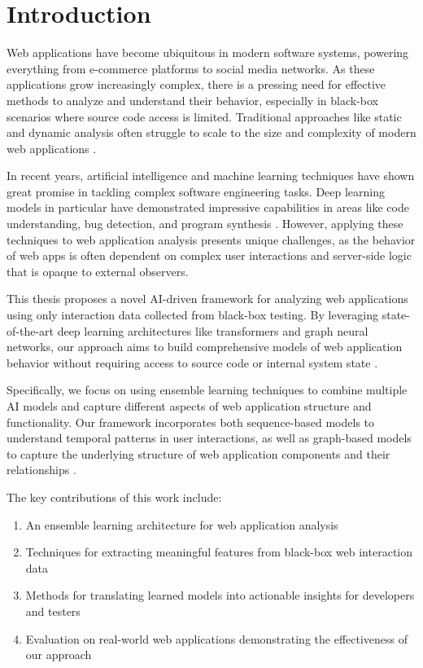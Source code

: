 \chapter{Introduction}
Web applications have become ubiquitous in modern software systems, powering everything from e-commerce platforms to social media networks. As these applications grow increasingly complex, there is a pressing need for effective methods to analyze and understand their behavior, especially in black-box scenarios where source code access is limited. Traditional approaches like static and dynamic analysis often struggle to scale to the size and complexity of modern web applications \cite{gan2013anomaly}.

In recent years, artificial intelligence and machine learning techniques have shown great promise in tackling complex software engineering tasks. Deep learning models in particular have demonstrated impressive capabilities in areas like code understanding, bug detection, and program synthesis \cite{mohammed2021effective}. However, applying these techniques to web application analysis presents unique challenges, as the behavior of web apps is often dependent on complex user interactions and server-side logic that is opaque to external observers.

This thesis proposes a novel AI-driven framework for analyzing web applications using only interaction data collected from black-box testing. By leveraging state-of-the-art deep learning architectures like transformers and graph neural networks, our approach aims to build comprehensive models of web application behavior without requiring access to source code or internal system state \cite{ding2022velvet}.

Specifically, we focus on using ensemble learning techniques to combine multiple AI models and capture different aspects of web application structure and functionality. Our framework incorporates both sequence-based models to understand temporal patterns in user interactions, as well as graph-based models to capture the underlying structure of web application components and their relationships \cite{mohammed2021effective}.
 
 The key contributions of this work include:

\begin{enumerate}
\item An ensemble learning architecture for web application analysis
\item Techniques for extracting meaningful features from black-box web interaction data
\item Methods for translating learned models into actionable insights for developers and testers
\item Evaluation on real-world web applications demonstrating the effectiveness of our approach
\end{enumerate}

